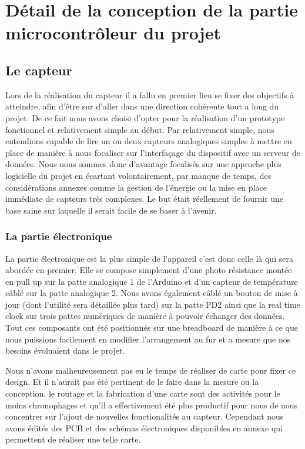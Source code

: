 \section{Détail de la conception de la partie microcontrôleur du projet}
	\subsection{Le capteur}
		Lors de la réalisation du capteur il a fallu en premier lieu se fixer
		des objectifs à atteindre, afin d'être sur d'aller dans une direction
		cohérente tout a long du projet. De  ce fait nous avons choisi d'opter pour
		la réalisation d'un prototype fonctionnel et relativement simple au début.
		Par relativement simple, nous entendions capable de lire un ou deux capteurs
		analogiques simples à mettre en place de manière à nous focaliser sur
		l'interfaçage du dispositif avec un serveur de données. Nous nous sommes
		donc d'avantage focalisés sur une approche plus logicielle du projet en
		écartant volontairement, par manque de temps, des considérations annexes
		comme la gestion de l'énergie ou la mise en place immédiate de capteurs
		très complexes. Le but était réellement de fournir une base saine sur laquelle
		il serait facile de se baser à l'avenir.
		
		\subsubsection{La partie électronique}
		
		La partie électronique est la plus simple de l'appareil c'est donc celle
		là qui sera abordée en premier. Elle se compose simplement d'une photo résistance
		montée en pull up sur la patte analogique 1 de l'Arduino et d'un capteur de
		température câblé sur la patte analogique 2. Nous avons également câblé un bouton de
		mise à jour (dont l'utilité sera détaillée plus tard) sur la patte PD2
		ainsi que la real time clock sur trois pattes numériques de manière à pouvoir
		échanger des données. Tout ces composants ont été positionnés sur une breadboard
		de manière à ce que nous puissions facilement en modifier l'arrangement au fur et a mesure
		que nos besoins évoluaient dans le projet.
		\par
		Nous n'avons malheureusement pas eu le temps de réaliser de carte
		pour fixer ce design. Et il n'aurait pas été pertinent de le faire dans la mesure
		ou la conception, le routage et la fabrication d'une carte sont des activités pour
		le moins chronophages et qu'il a effectivement été plus productif pour nous de nous
		concentrer sur l'ajout de nouvelles fonctionalités au capteur. Cependant
		nous avons édités des PCB et des schémas électroniques disponibles en
		annexe qui permettent de réaliser une telle carte.
		
